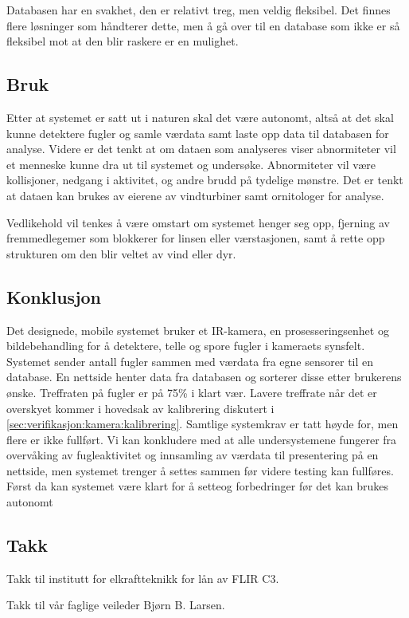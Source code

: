 Databasen har en svakhet, den er relativt treg, men veldig fleksibel. Det finnes flere løsninger som håndterer dette, men å gå over til en database som ikke er så fleksibel mot at den blir raskere er en mulighet. 


\subsection{Bruk}

Etter at systemet er satt ut i naturen skal det være autonomt, altså at det skal kunne detektere fugler og samle værdata samt laste opp data til databasen for analyse. Videre er det tenkt at om dataen som analyseres viser abnormiteter vil et menneske kunne dra ut til systemet og undersøke. Abnormiteter vil være kollisjoner, nedgang i aktivitet, og andre brudd på tydelige mønstre. Det er tenkt at dataen kan brukes av eierene av vindturbiner samt ornitologer for analyse. 

Vedlikehold vil tenkes å være omstart om systemet henger seg opp, fjerning av fremmedlegemer som blokkerer for linsen eller værstasjonen, samt å rette opp strukturen om den blir veltet av vind eller dyr. 

\subsection{Konklusjon}
Det designede, mobile systemet bruker et IR-kamera, en prosesseringsenhet og bildebehandling for å detektere, telle og spore fugler i kameraets synsfelt. Systemet sender antall fugler sammen med værdata fra egne sensorer til en database. En nettside henter data fra databasen og sorterer disse etter brukerens ønske. Treffraten på fugler er på 75\% i klart vær. Lavere treffrate når det er overskyet kommer i hovedsak av kalibrering diskutert i \autoref{sec:verifikasjon:kamera:kalibrering}. Samtlige systemkrav er tatt høyde for, men flere er ikke fullført.
Vi kan konkludere med at alle undersystemene fungerer fra overvåking av fugleaktivitet og innsamling av værdata til presentering på en nettside, men systemet trenger å settes sammen før videre testing kan fullføres. Først da kan systemet være klart for å setteog forbedringer før det kan brukes autonomt





\subsection{Takk}

Takk til institutt for elkraftteknikk for lån av FLIR C3. 

Takk til vår faglige veileder Bjørn B. Larsen.